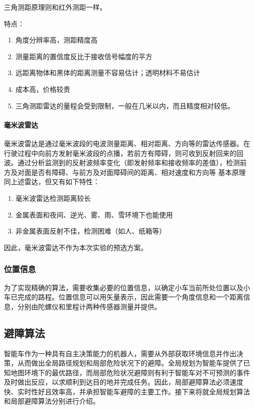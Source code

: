 \documentclass{report}
\begin{document}
三角测距原理则和红外测距一样。

特点：
\begin{enumerate}
\item 角度分辨率高，测距精度高
\item 测量距离的置信度反比于接收信号幅度的平方
\item 远距离物体和黑体的距离测量不容易估计；透明材料不易估计
\item 成本高，价格较贵
  \item 三角测距雷达的量程会受到限制，一般在几米以内，而且精度相对较低\cite{jh1}。
  \end{enumerate}

  \paragraph{毫米波雷达}
  
  毫米波雷达是通过毫米波段的电波测量距离、相对距离、方向等的雷达传感器。在行驶过程中向前方发射毫米波段的点播，若前方有障碍，则可收到反射回来的回波。通过分析监测到的反射波频率变化（即发射频率和接收频率的差值），检测前方及对面是否有障碍、与前方及对面障碍间的距离、相对速度和方向等
  基本原理同上述雷达，但又有如下特性：
  \begin{enumerate}
  \item 毫米波雷达检测距离较长
  \item 金属表面和夜间、逆光、雾、雨、雪环境下也能使用
  \item 非金属表面反射不佳，检测困难（如人、纸箱等）
  \end{enumerate}
  因此，毫米波雷达不作为本次实验的预选方案\cite{jh2}。

  \subsubsection{位置信息}
  \label{subsec:label}
为了实现精确的算法，需要收集必要的位置信息，以确定小车当前所处位置以及小车已完成的路程。位置信息可以用矢量表示，因此需要一个角度信息和一个距离信息，分别由陀螺仪和里程计两种传感器测量并提供。

\subsection{避障算法}
\label{subsec:label}
智能车作为一种具有自主决策能力的机器人，需要从外部获取环境信息并作出决策，从而做出全局路径规划和局部危险状况下的避障。全局规划为智能车提供了已知地图环境下的最优路径，而局部危险状况避障则有利于智能车对不可预测的事件及时做出反应，以求顺利到达目的地并完成任务。因此，局部避障算法必须速度快、实时性好且效率高，并承担智能车避障的主要工作。接下来将就全局规划算法和局部避障算法分别进行介绍。
\end{document}

